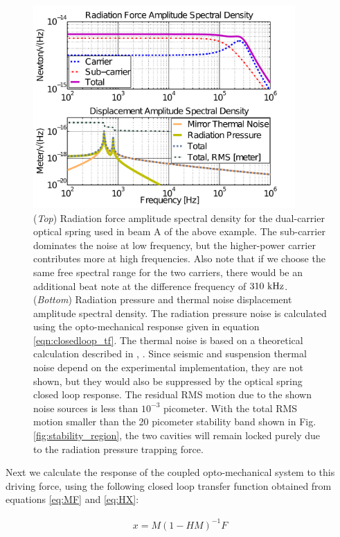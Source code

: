 \begin{figure}[htbp]
	\centering
		\includegraphics[width=10cm]{./figures/trap_radPresA_paper2.pdf}
	\caption[Radiation Pressure Noise]{
        (\emph{Top}) Radiation force amplitude spectral density for the dual-carrier optical spring used in beam A of the above example. The sub-carrier dominates the noise at low frequency, but the higher-power carrier contributes more at high frequencies. Also note that if we choose the same free spectral range for the two carriers, there would be an additional beat note at the difference frequency of $310~{\rm kHz}$. (\emph{Bottom})  Radiation pressure and thermal noise displacement amplitude spectral density. The radiation pressure noise is calculated using the opto-mechanical response given in equation \ref{eqn:closedloop_tf}. The thermal noise is based on a theoretical calculation described in \cite{Saulson90}, \cite{Ballmer13}. Since seismic and suspension thermal noise depend on the experimental implementation, they are not shown, but they would also be suppressed by the optical spring closed loop response. The residual RMS motion due to the shown noise sources is less than $10^{-3}$ picometer. With the total RMS motion smaller than the 20 picometer stability band shown in Fig.\ref{fig:stability_region}, the two cavities will remain locked purely due to the radiation pressure trapping force.}
	\label{fig:RFASD}
\end{figure}

Next we calculate the response of the coupled opto-mechanical system to this driving force, using the following closed loop transfer function obtained from equations \ref{eq:MF} and \ref{eq:HX}:

\begin{eqnarray}
\label{eqn:closedloop_tf}
x = {M}({1-HM})^{-1}F
\end{eqnarray}

